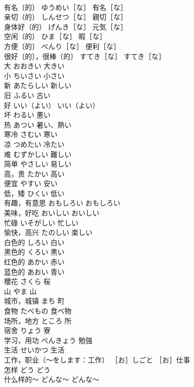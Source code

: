 \documentclass[8pt]{extreport}
\begin{document}
\begin{CJK}{UTF8}{min}
\\	有名〔的〕	ゆうめい［な］	有名［な］
\\	亲切（的）	しんせつ［な］	親切［な］
\\	身体好（的）	げんき［な］	元気［な］
\\	空闲（的）	ひま［な］	暇［な］
\\	方便〔的〕	べんり［な］	便利［な］
\\	很好〔的〕，很棒〔的〕	すてき［な］	すてき［な］
\\	大	おおきい	大きい
\\	小	ちいさい	小さい
\\	新	あたらしい	新しい
\\	旧	ふるい	古い
\\	好	いい（よい）	いい（よい）
\\	坏	わるい	悪い
\\	热	あつい	暑い、熱い
\\	寒冷	さむい	寒い
\\	凉	つめたい	冷たい
\\	难	むずかしい	難しい
\\	简单	やさしい	易しい
\\	高，贵	たかい	高い
\\	便宜	やすい	安い
\\	低，矮	ひくい	低い
\\	有趣，有意思	おもしろい	おもしろい
\\	美味，好吃	おいしい	おいしい
\\	忙碌	いそがしい	忙しい
\\	愉快，高兴	たのしい	楽しい
\\	白色的	しろい	白い
\\	黑色的	くろい	黒い
\\	红色的	あかい	赤い
\\	蓝色的	あおい	青い
\\	櫻花	さくら	桜
\\	山	やま	山
\\	城市，城镇	まち	町
\\	食物	たべもの	食べ物
\\	场所，地方	ところ	所
\\	宿舍	りょう	寮
\\	学习，用功	べんきょう	勉強
\\	生活	せいかつ	生活
\\	工作，职业（～をします：工作）	［お］しごと	［お］仕事
\\	怎样	どう	どう
\\	什么样的～	どんな～	どんな～

\end{CJK}
\end{document}
